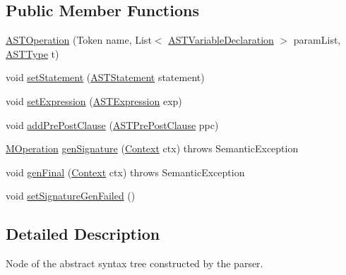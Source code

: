 \subsection*{Public Member Functions}
\begin{DoxyCompactItemize}
\item 
\hyperlink{classorg_1_1tzi_1_1use_1_1parser_1_1use_1_1_a_s_t_operation_a0c6eba8eb072b653b1d5c7501a744382}{A\-S\-T\-Operation} (Token name, List$<$ \hyperlink{classorg_1_1tzi_1_1use_1_1parser_1_1ocl_1_1_a_s_t_variable_declaration}{A\-S\-T\-Variable\-Declaration} $>$ param\-List, \hyperlink{classorg_1_1tzi_1_1use_1_1parser_1_1ocl_1_1_a_s_t_type}{A\-S\-T\-Type} t)
\item 
void \hyperlink{classorg_1_1tzi_1_1use_1_1parser_1_1use_1_1_a_s_t_operation_ad7fa2b7525d56cfc293ab4752134f726}{set\-Statement} (\hyperlink{classorg_1_1tzi_1_1use_1_1parser_1_1soil_1_1ast_1_1_a_s_t_statement}{A\-S\-T\-Statement} statement)
\item 
void \hyperlink{classorg_1_1tzi_1_1use_1_1parser_1_1use_1_1_a_s_t_operation_a8dcb0ce436e472e1fa37fccf78ba64cb}{set\-Expression} (\hyperlink{classorg_1_1tzi_1_1use_1_1parser_1_1ocl_1_1_a_s_t_expression}{A\-S\-T\-Expression} exp)
\item 
void \hyperlink{classorg_1_1tzi_1_1use_1_1parser_1_1use_1_1_a_s_t_operation_a80c815960e1274bc40a400eeeebc97b0}{add\-Pre\-Post\-Clause} (\hyperlink{classorg_1_1tzi_1_1use_1_1parser_1_1use_1_1_a_s_t_pre_post_clause}{A\-S\-T\-Pre\-Post\-Clause} ppc)
\item 
\hyperlink{classorg_1_1tzi_1_1use_1_1uml_1_1mm_1_1_m_operation}{M\-Operation} \hyperlink{classorg_1_1tzi_1_1use_1_1parser_1_1use_1_1_a_s_t_operation_a38c066c82ef07e85a4d2fdfd762afb81}{gen\-Signature} (\hyperlink{classorg_1_1tzi_1_1use_1_1parser_1_1_context}{Context} ctx)  throws Semantic\-Exception      
\item 
void \hyperlink{classorg_1_1tzi_1_1use_1_1parser_1_1use_1_1_a_s_t_operation_adad3173fb1906cb58cb478e3529d4065}{gen\-Final} (\hyperlink{classorg_1_1tzi_1_1use_1_1parser_1_1_context}{Context} ctx)  throws Semantic\-Exception      
\item 
void \hyperlink{classorg_1_1tzi_1_1use_1_1parser_1_1use_1_1_a_s_t_operation_adfc3fadfb155ebca68149b60aace3b45}{set\-Signature\-Gen\-Failed} ()
\end{DoxyCompactItemize}


\subsection{Detailed Description}
Node of the abstract syntax tree constructed by the parser.

